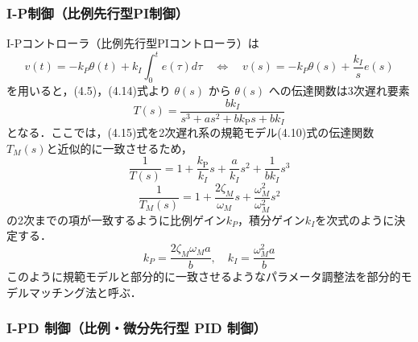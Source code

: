 \subsubsection{I-P制御（比例先行型PI制御）}
I-Pコントローラ（比例先行型PIコントローラ）は
\begin{equation}
  v(t) = -k_P \theta(t) + k_I \int_0^t e(\tau) d\tau \quad \Longleftrightarrow \quad v(s) = -k_P \theta(s) + \frac{k_I}{s} e(s) \tag{4.14}
\end{equation}
を用いると，(4.5)，(4.14)式より \(\theta(s)\) から \(\theta(s)\) への伝達関数は3次遅れ要素
\begin{equation}
  T(s) = \frac{bk_I}{s^3 + as^2 + bk_{\mathrm{P}} s + bk_I} \tag{4.15}
\end{equation}
となる．ここでは，(4.15)式を2次遅れ系の規範モデル(4.10)式の伝達関数\(T_M(s)\)と近似的に一致させるため，
\begin{equation}
  \frac{1}{T(s)} = 1 + \frac{k_{\mathrm{P}}}{k_I}s + \frac{a}{k_I}s^2 + \frac{1}{bk_I}s^3 \tag{4.16}
\end{equation}
\begin{equation}
  \frac{1}{T_M(s)} = 1 + \frac{2\zeta_M}{\omega_M}s + \frac{\omega_M^2}{\omega_M^2}s^2 \tag{4.17}
\end{equation}
の2次までの項が一致するように比例ゲイン\(k_P\)，積分ゲイン\(k_I\)を次式のように決定する．
\begin{equation}
  k_P = \frac{2\zeta_M \omega_M a}{b}, \quad k_I = \frac{\omega_M^2 a}{b} \tag{4.18}
\end{equation}
このように規範モデルと部分的に一致させるようなパラメータ調整法を部分的モデルマッチング法と呼ぶ．

\subsubsection{I-PD 制御（比例・微分先行型 PID 制御）}


